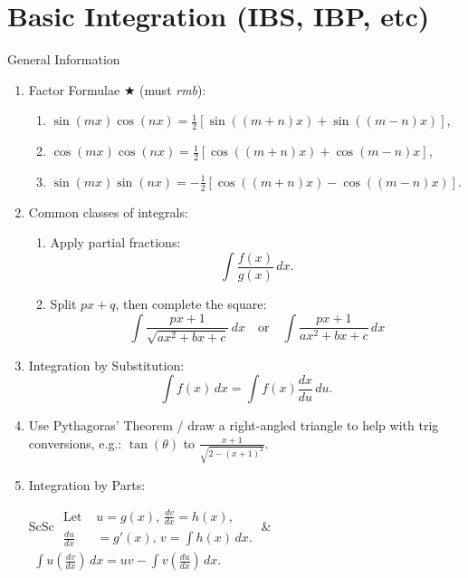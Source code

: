 \documentclass[oneside]{book}
\begin{document}
\section{Basic Integration (IBS, IBP, etc)}
\begin{stbox}{General Information}
  \begin{enumerate}
    \item Factor Formulae \(\bigstar\) (must \emph{rmb}):
    \begin{enumerate}
      \item \(\sin(mx)\cos(nx)=\frac{1}{2}[\sin((m+n)x)+\sin((m-n)x)]\),
      \item \(\cos(mx)\cos(nx)=\frac{1}{2}[\cos((m+n)x)+\cos(m-n)x]\),
      \item \(\sin(mx)\sin(nx)=-\frac{1}{2}[\cos((m+n)x)-\cos((m-n)x)]\).
    \end{enumerate}
    \item Common classes of integrals:
    \begin{enumerate}
      \item Apply partial fractions:
      \[\int\frac{f(x)}{g(x)}\,dx.\]
      \item Split \(px+q\), then complete the square:
      \[\int \frac{px+1}{\sqrt{ax^2+bx+c}}\,dx \quad\text{or}\quad \int \frac{px+1}{ax^2+bx+c}\,dx\] 
    \end{enumerate}
    \item Integration by Substitution: 
    \[\int f(x) \, dx=\int f(x)\frac{dx}{du}\,du.\]
    \item Use Pythagoras' Theorem / draw a right-angled triangle to help with trig conversions, e.g.: \(\tan(\theta)\) to \(\frac{x+1}{\sqrt{2-(x+1)^2}}\).
    \item Integration by Parts:
    \begin{center}
      \begin{tabular}{ScSc}
        \(\begin{aligned}
          \text{Let }&u=g(x)\text{, }\frac{dv}{dx}=h(x),\\
          \frac{du}{dx}&=g'(x)\text{, }v=\int h(x)\, dx.
        \end{aligned}\) & \hspace{1cm}\(\begin{aligned}
          \int u\left(\frac{dv}{dx}\right)\,dx=uv-\int v \left(\frac{du}{dx}\right)\,dx.
        \end{aligned}\)
      \end{tabular}
    \end{center}
  \end{enumerate}
\end{stbox}
\newpage
\end{document}
